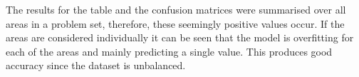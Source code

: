 The results for the table and the confusion matrices were summarised over all areas in a problem set, therefore, these seemingly positive values occur. If the areas are considered individually it can be seen that the model is overfitting for each of the areas and mainly predicting a single value. This produces good accuracy since the dataset is unbalanced.